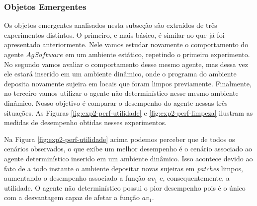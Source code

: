 \subsubsection{Objetos Emergentes}

Os objetos emergentes analisados nesta subseção são extraídos de três experimentos distintos. O primeiro, e mais básico, é similar ao que já foi apresentado anteriormente. Nele vamos estudar novamente o comportamento do agente $AgSoftware$ em um ambiente estático, repetindo o primeiro experimento. No segundo vamos avaliar o comportamento desse mesmo agente, mas dessa vez ele estará inserido em um ambiente dinâmico, onde o programa do ambiente deposita novamente sujeira em locais que foram limpos previamente. Finalmente, no terceiro vamos utilizar o agente não determinístico nesse mesmo ambiente dinâmico. Nosso objetivo é comparar o desempenho do agente nessas três situações. As Figuras \ref{fig:exp2-perf-utilidade} e \ref{fig:exp2-perf-limpeza} ilustram as medidas de desempenho obtidas nesses experimentos.

\begin{figure}[h!]
    \centering
\end{figure}

Na Figura \ref{fig:exp2-perf-utilidade} acima podemos perceber que de todos os cenários observados, o que exibe um melhor desempenho é o cenário associado ao agente determinístico inserido em um ambiente dinâmico.  Isso acontece devido ao fato de a todo instante o ambiente depositar novas sujeiras em \textit{patches} limpos, aumentando o desempenho associado a função $av_1$ e, consequentemente, a utilidade.  O agente não determinístico possui o pior desempenho pois é o único com a desvantagem capaz de afetar a função $av_1$. 

